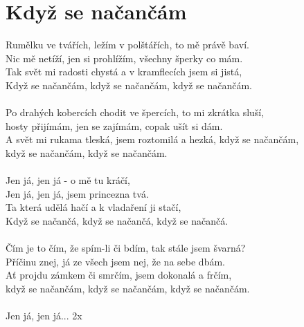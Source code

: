 \section{Když se načančám}
Rumělku ve tvářích, ležím v polštářích, to mě právě baví.\\
Nic mě netíží, jen si prohlížím, všechny šperky co mám.\\
Tak svět mi radosti chystá a v kramflecích jsem si jistá,\\
Když se načančám, když se načančám, když se načančám.\\
\\
Po drahých kobercích chodit ve špercích, to mi zkrátka sluší,\\
hosty přijímám, jen se zajímám, copak ušít si dám.\\
A svět mi rukama tleská, jsem roztomilá a hezká, když se načančám,\\
když se načančám, když se načančám.\\
\\
Jen já, jen já - o mě tu kráčí,\\
Jen já, jen já, jsem princezna tvá.\\
Ta která udělá hačí a k vladaření ji stačí,\\
Když se načančá, když se načančá, když se načančá.\\
\\
Čím je to čím, že spím-li či bdím, tak stále jsem švarná?\\
Příčinu znej, já ze všech jsem nej, že na sebe dbám.\\
Ať projdu zámkem či smrčím, jsem dokonalá a frčím,\\
když se načančám, když se načančám, když se načančám.\\
\\
Jen já, jen já... 2x\\